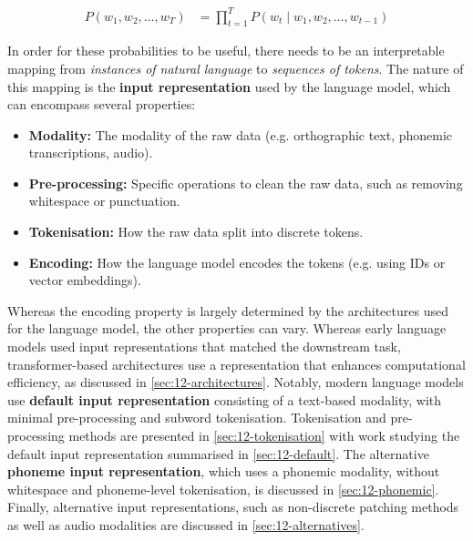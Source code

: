 \begin{align}
P(w_1, w_2, \dots, w_T) &= \prod_{t=1}^{T} P\left(w_t \mid w_1, w_2, \dots, w_{t-1} \right) \label{eq:languagemodel}
\end{align}

In order for these probabilities to be useful, there needs to be an interpretable mapping from \emph{instances of natural language} to \emph{sequences of tokens}. The nature of this mapping is the \textbf{input representation} used by the language model, which can encompass several properties:
\begin{itemize}
\item \textbf{Modality:} The modality of the raw data (e.g. orthographic text, phonemic transcriptions, audio).
\item \textbf{Pre-processing:} Specific operations to clean the raw data, such as removing whitespace or punctuation. 
\item \textbf{Tokenisation:} How the raw data split into discrete tokens.
\item \textbf{Encoding:} How the language model encodes the tokens (e.g. using IDs or vector embeddings).
\end{itemize}

Whereas the encoding property is largely determined by the architectures used for the language model, the other properties can vary. Whereas early \ngram language models used input representations that matched the downstream task, transformer-based architectures use a representation that enhances computational efficiency, as discussed in \cref{sec:12-architectures}. Notably, modern language models use \textbf{default input representation} consisting of a text-based modality, with minimal pre-processing and subword tokenisation. Tokenisation and pre-processing methods are presented in \cref{sec:12-tokenisation} with work studying the default input representation summarised in \cref{sec:12-default}. The alternative \textbf{phoneme input representation}, which uses a phonemic modality, without whitespace and phoneme-level tokenisation, is discussed in \cref{sec:12-phonemic}. Finally, alternative input representations, such as non-discrete patching methods as well as audio modalities are discussed in \cref{sec:12-alternatives}.


